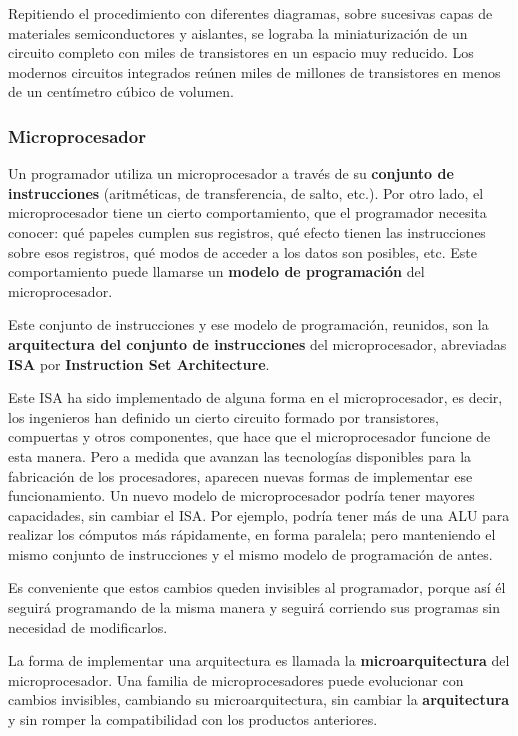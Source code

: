 \documentclass[spanish,a4paper,]{article}
\begin{document}
Repitiendo el procedimiento con diferentes diagramas, sobre sucesivas
capas de materiales semiconductores y aislantes, se lograba la
miniaturización de un circuito completo con miles de transistores en un
espacio muy reducido. Los modernos circuitos integrados reúnen miles de
millones de transistores en menos de un centímetro cúbico de volumen.

\hypertarget{microprocesador}{%
\subsubsection{Microprocesador}\label{microprocesador}}

Un programador utiliza un microprocesador a través de su
\textbf{conjunto de instrucciones} (aritméticas, de transferencia, de
salto, etc.). Por otro lado, el microprocesador tiene un cierto
comportamiento, que el programador necesita conocer: qué papeles cumplen
sus registros, qué efecto tienen las instrucciones sobre esos registros,
qué modos de acceder a los datos son posibles, etc. Este comportamiento
puede llamarse un \textbf{modelo de programación} del microprocesador.

Este conjunto de instrucciones y ese modelo de programación, reunidos,
son la \textbf{arquitectura del conjunto de instrucciones} del
microprocesador, abreviadas \textbf{ISA} por \textbf{Instruction Set
Architecture}.

Este ISA ha sido implementado de alguna forma en el microprocesador, es
decir, los ingenieros han definido un cierto circuito formado por
transistores, compuertas y otros componentes, que hace que el
microprocesador funcione de esta manera. Pero a medida que avanzan las
tecnologías disponibles para la fabricación de los procesadores,
aparecen nuevas formas de implementar ese funcionamiento. Un nuevo
modelo de microprocesador podría tener mayores capacidades, sin cambiar
el ISA. Por ejemplo, podría tener más de una ALU para realizar los
cómputos más rápidamente, en forma paralela; pero manteniendo el mismo
conjunto de instrucciones y el mismo modelo de programación de antes.

Es conveniente que estos cambios queden invisibles al programador,
porque así él seguirá programando de la misma manera y seguirá corriendo
sus programas sin necesidad de modificarlos.

La forma de implementar una arquitectura es llamada la
\textbf{microarquitectura} del microprocesador. Una familia de
microprocesadores puede evolucionar con cambios invisibles, cambiando su
microarquitectura, sin cambiar la \textbf{arquitectura} y sin romper la
compatibilidad con los productos anteriores.
\end{document}
